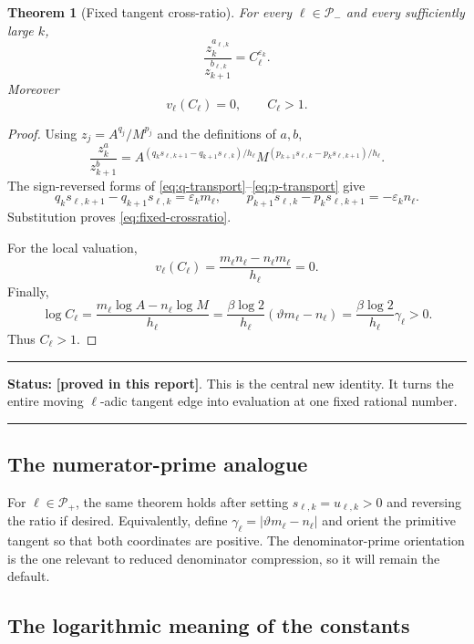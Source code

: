 \documentclass[11pt,oneside]{article}
\newtheorem{theorem}{Theorem}[section]
\theoremstyle{definition}
\theoremstyle{remark}
\newcommand{\thetaq}{\vartheta}
\newcommand{\eps}{\varepsilon}
\newcommand{\provedhere}{\textcolor{proofgreen}{\textbf{[proved in this report]}}}
\newenvironment{statusbox}[1]
{\begin{center}\begin{minipage}{0.94\textwidth}\raggedright\hrule\vspace{0.45em}\textbf{Status:} #1\par\vspace{0.35em}}
{\vspace{0.35em}\hrule\end{minipage}\end{center}}
\begin{document}
\begin{theorem}[Fixed tangent cross-ratio]
\label{thm:fixed-crossratio}
For every $\ell\in\mathcal P_-$ and every sufficiently large $k$,
\begin{equation}
 \boxed{
 \frac{z_k^{a_{\ell,k}}}{z_{k+1}^{b_{\ell,k}}}
 =C_\ell^{\eps_k}.}
 \label{eq:fixed-crossratio}
\end{equation}
Moreover
\begin{equation}
 v_\ell(C_\ell)=0,
 \qquad C_\ell>1.
 \label{eq:C-properties}
\end{equation}
\end{theorem}

\begin{proof}
Using $z_j=A^{q_j}/M^{p_j}$ and the definitions of $a,b$,
\[
 \frac{z_k^a}{z_{k+1}^b}
 =A^{(q_ks_{\ell,k+1}-q_{k+1}s_{\ell,k})/h_\ell}
  M^{(p_{k+1}s_{\ell,k}-p_ks_{\ell,k+1})/h_\ell}.
\]
The sign-reversed forms of \eqref{eq:q-transport}--\eqref{eq:p-transport} give
\[
 q_ks_{\ell,k+1}-q_{k+1}s_{\ell,k}=\eps_km_\ell,
 \qquad
 p_{k+1}s_{\ell,k}-p_ks_{\ell,k+1}=-\eps_kn_\ell.
\]
Substitution proves \eqref{eq:fixed-crossratio}.

For the local valuation,
\[
 v_\ell(C_\ell)
 =\frac{m_\ell n_\ell-n_\ell m_\ell}{h_\ell}=0.
\]
Finally,
\[
 \log C_\ell
 =\frac{m_\ell\log A-n_\ell\log M}{h_\ell}
 =\frac{\beta\log2}{h_\ell}(\thetaq m_\ell-n_\ell)
 =\frac{\beta\log2}{h_\ell}\gamma_\ell>0.
\]
Thus $C_\ell>1$.
\end{proof}

\begin{statusbox}{\provedhere.  This is the central new identity.  It turns the entire
moving $\ell$-adic tangent edge into evaluation at one fixed rational number.}
\end{statusbox}

\subsection{The numerator-prime analogue}

For $\ell\in\mathcal P_+$, the same theorem holds after setting
$s_{\ell,k}=u_{\ell,k}>0$ and reversing the ratio if desired.  Equivalently, define
$\gamma_\ell=|\thetaq m_\ell-n_\ell|$ and orient the primitive tangent so that both
coordinates are positive.  The denominator-prime orientation is the one relevant to reduced
denominator compression, so it will remain the default.

\subsection{The logarithmic meaning of the constants}
\end{document}
